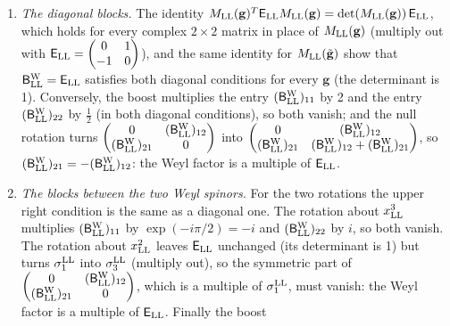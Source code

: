 \documentclass[
  10pt,
]{article}
\begin{document}
\begin{enumerate}
\def\labelenumi{(\alph{enumi})}
\item
  \emph{The diagonal blocks.} The identity
  \(M_{\rm LL}(\mathbf g)^T\mathsf E_{\rm LL}M_{\rm LL}(\mathbf g)=\det(M_{\rm LL}(\mathbf g))\,\mathsf E_{\rm LL}\),
  which holds for every complex \(2\times2\) matrix in place of
  \(M_{\rm LL}(\mathbf g)\) (multiply out with
  \(\mathsf E_{\rm LL}=\begin{pmatrix}0&1\\-1&0\end{pmatrix}\)), and the
  same identity for \(M_{\rm LL}(\tilde{\mathbf g})\) show that
  \(\mathsf B^{\rm W}_{\rm LL}=\mathsf E_{\rm LL}\) satisfies both
  diagonal conditions for every \(\mathbf g\) (the determinant is 1).
  Conversely, the boost multiplies the entry
  \((\mathsf B^{\rm W}_{\rm LL})_{11}\) by 2 and the entry
  \((\mathsf B^{\rm W}_{\rm LL})_{22}\) by \(\tfrac12\) (in both
  diagonal conditions), so both vanish; and the null rotation turns
  \(\begin{pmatrix}0&(\mathsf B^{\rm W}_{\rm LL})_{12}\\(\mathsf B^{\rm W}_{\rm LL})_{21}&0\end{pmatrix}\)
  into
  \(\begin{pmatrix}0&(\mathsf B^{\rm W}_{\rm LL})_{12}\\(\mathsf B^{\rm W}_{\rm LL})_{21}&(\mathsf B^{\rm W}_{\rm LL})_{12}+(\mathsf B^{\rm W}_{\rm LL})_{21}\end{pmatrix}\),
  so
  \((\mathsf B^{\rm W}_{\rm LL})_{21}=-(\mathsf B^{\rm W}_{\rm LL})_{12}\):
  the Weyl factor is a multiple of \(\mathsf E_{\rm LL}\).
\item
  \emph{The blocks between the two Weyl spinors.} For the two rotations
  the upper right condition is the same as a diagonal one. The rotation
  about \(x^3_{\rm LL}\) multiplies
  \((\mathsf B^{\rm W}_{\rm LL})_{11}\) by \(\exp(-i\pi/2)=-i\) and
  \((\mathsf B^{\rm W}_{\rm LL})_{22}\) by \(i\), so both vanish. The
  rotation about \(x^2_{\rm LL}\) leaves \(\mathsf E_{\rm LL}\)
  unchanged (its determinant is 1) but turns \(\sigma^{\rm LL}_1\) into
  \(\sigma^{\rm LL}_3\) (multiply out), so the symmetric part of
  \(\begin{pmatrix}0&(\mathsf B^{\rm W}_{\rm LL})_{12}\\(\mathsf B^{\rm W}_{\rm LL})_{21}&0\end{pmatrix}\),
  which is a multiple of \(\sigma^{\rm LL}_1\), must vanish: the Weyl
  factor is a multiple of \(\mathsf E_{\rm LL}\). Finally the boost

\end{enumerate}
\end{document}
